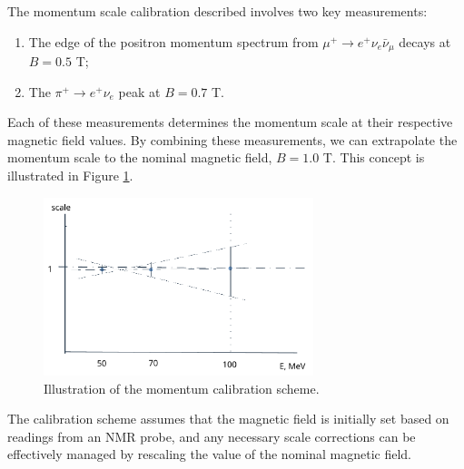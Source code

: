 The momentum scale calibration described involves two key measurements: 
\begin{enumerate}
    \item The edge of the positron momentum spectrum 
    from $\mu^+ \rightarrow e^+ \nu_e \bar{\nu}_\mu$ decays 
    at $B = 0.5$ T;
    \item The $\pi^+ \rightarrow e^+ \nu_e$ peak at $B = 0.7$ T.
\end{enumerate}

Each of these measurements determines the momentum scale at their respective 
magnetic field values. By combining these measurements, we can extrapolate the 
momentum scale to the nominal magnetic field, $B = 1.0$ T. This concept is illustrated in Figure \ref{fig:momscale}.

\begin{figure}[!h]
\centering
\includegraphics[width=0.7\textwidth]{figures/png/Screenshot_20240707_180742.png}
\caption[The momentum calibration scheme.]{Illustration of the momentum calibration scheme.}
\label{fig:momscale}

\end{figure}

The calibration scheme assumes that the magnetic field is initially set based 
on readings from an NMR probe, {\red and any necessary scale corrections can be 
  effectively managed by rescaling the value of the nominal magnetic field.}


